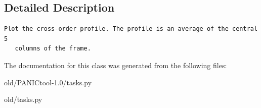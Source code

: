 \subsection{Detailed Description}


\footnotesize\begin{verbatim}Plot the cross-order profile. The profile is an average of the central 5
   columns of the frame.
\end{verbatim}
\normalsize
 



The documentation for this class was generated from the following files:\begin{CompactItemize}
\item 
old/PANICtool-1.0/tasks.py\item 
old/tasks.py\end{CompactItemize}

